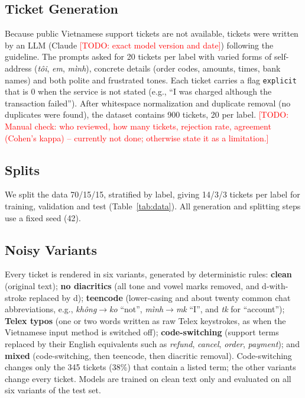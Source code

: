 \documentclass[conference]{IEEEtran}
\newcommand{\TODO}[1]{\textcolor{red}{[TODO: #1]}}
\begin{document}
\subsection{Ticket Generation}
Because public Vietnamese support tickets are not available, tickets were
written by an LLM (Claude \TODO{exact model version and date}) following the
guideline. The prompts asked for 20 tickets per label with varied forms of
self-address (\textit{t\^oi}, \textit{em}, \textit{m\`inh}), concrete details
(order codes, amounts, times, bank names) and both polite and frustrated
tones. Each ticket carries a flag \texttt{explicit} that is 0 when the
service is not stated (e.g., ``I was charged although the transaction
failed''). After whitespace normalization and duplicate removal (no
duplicates were found), the dataset contains 900 tickets, 20 per label.
\TODO{Manual check: who reviewed, how many tickets, rejection rate,
agreement (Cohen's kappa) -- currently not done; otherwise state it as a
limitation.}

\subsection{Splits}
We split the data 70/15/15, stratified by label, giving 14/3/3 tickets per
label for training, validation and test (Table~\ref{tab:data}). All
generation and splitting steps use a fixed seed (42).

\subsection{Noisy Variants}
Every ticket is rendered in six variants, generated by deterministic
rules: \textbf{clean} (original text); \textbf{no diacritics} (all tone and
vowel marks removed, and d-with-stroke replaced by d); \textbf{teencode}
(lower-casing and about twenty common chat abbreviations, e.g.,
\textit{kh\^ong}$\rightarrow$\textit{ko} ``not'',
\textit{m\`inh}$\rightarrow$\textit{mk} ``I'', and \textit{tk} for
``account''); \textbf{Telex typos}
(one or two words written as raw Telex keystrokes, as when the Vietnamese
input method is switched off); \textbf{code-switching} (support terms
replaced by their English equivalents such as \textit{refund},
\textit{cancel}, \textit{order}, \textit{payment}); and \textbf{mixed}
(code-switching, then teencode, then diacritic removal). Code-switching
changes only the 345 tickets (38\%) that contain a listed term; the other
variants change every ticket. Models are trained on clean text only and
evaluated on all six variants of the test set.
\end{document}
